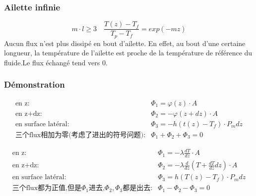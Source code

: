 \documentclass[openany]{book}
\begin{document}
\subsubsection{Ailette infinie}
$$
m\cdot l \geq 3 \quad  \frac{T(z)-T_f}{T_p - T_f}=exp(-mz)
$$
Aucun flux n'est plus dissip\'e en bout d'ailette. En effet, au bout d'une certaine longueur, la temp\'erature de l'ailette est proche de la temp\'erature de r\'ef\'erence du fluide.Le flux \'echang\'e tend vers $0$.

\subsubsection{D\'emonstration}
%

\begin{eqnarray}
 \text{en z:} & \Phi_1=\varphi(z)\cdot A \\
 \text{en z+dz:} &\Phi_2=-\varphi(z+dz) \cdot A\\
 \text{en surface lat\'eral:} & \Phi_3=-h(t(z)-T_f) \cdot P_m dz \\
 \text{三个flux相加为零(考虑了进出的符号问题):}  &\Phi_1 + \Phi_2 + \Phi_3 = 0
 \end{eqnarray}

\begin{eqnarray}
 \text{en z:} & \Phi_1=- \lambda \frac{dT}{dz} \cdot A \\
 \text{en z+dz:} &\Phi_2=-\lambda \frac{ d}{dz}(T+\frac{dT}{dz}dz) \cdot A\\
 \text{en surface lat\'eral:} & \Phi_3=h(T(z)-T_f) \cdot P_m dz \\
 \text{三个flux都为正值,但是$\Phi_1$进去,$\Phi_2,\Phi_3$都是出去:}  &\Phi_1 - \Phi_2 - \Phi_3 = 0\\
\end{eqnarray}
\end{document}
